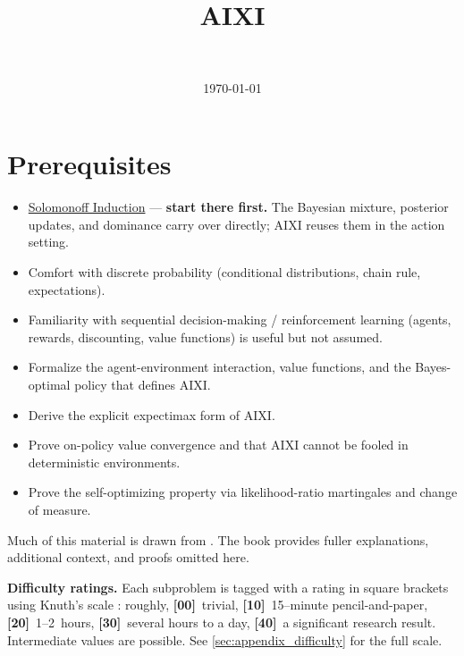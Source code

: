 \documentclass[fontsize=11pt, parskip=half]{scrartcl}
\begin{document}
\title{AIXI}
\author{\\ }
\date{\today}
\maketitle

\section*{Prerequisites}

\begin{itemize}
    \item \href{/agency/solomonoff-induction}{Solomonoff Induction} ---
    \textbf{start there first.} The Bayesian mixture, posterior updates, and
    dominance carry over directly; AIXI reuses them in the action setting.
    \item Comfort with discrete probability (conditional distributions, chain rule,
    expectations).
    \item Familiarity with sequential decision-making / reinforcement learning
    (agents, rewards, discounting, value functions) is useful but not assumed.
\end{itemize}

\begin{learningoutcomes}
  \begin{itemize}
    \item Formalize the agent-environment interaction, value functions, and the Bayes-optimal policy that defines AIXI.
    \item Derive the explicit expectimax form of AIXI.
    \item Prove on-policy value convergence and that AIXI cannot be fooled in deterministic environments.
    \item Prove the self-optimizing property via likelihood-ratio martingales and change of measure.
  \end{itemize}
\end{learningoutcomes}

\medskip
\noindent
Much of this material is drawn from \cite{Hutter:24uaibook2}. 
The book provides fuller explanations, additional context, and proofs omitted here.

\medskip
\noindent
\textbf{Difficulty ratings.} Each subproblem is tagged with a rating in square brackets using Knuth's scale \cite{Knuth:73a}: roughly, \textbf{[00]}~trivial, \textbf{[10]}~15--minute pencil-and-paper, \textbf{[20]}~1--2~hours, \textbf{[30]}~several hours to a day, \textbf{[40]}~a significant research result. Intermediate values are possible. See \cref{sec:appendix_difficulty} for the full scale. 
\end{document}
